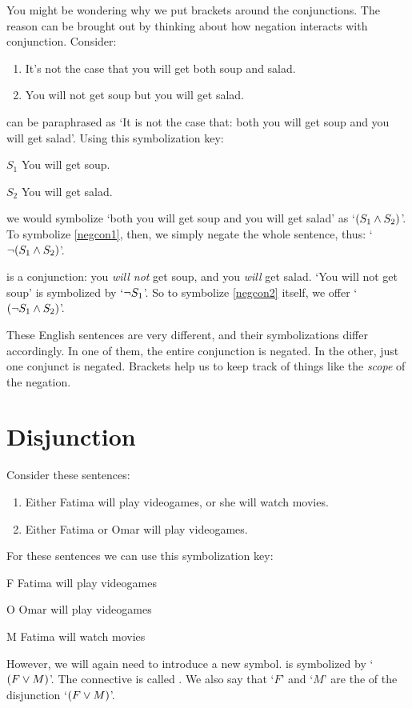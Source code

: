 You might be wondering why
we put brackets around the conjunctions. The reason can be brought out
by thinking about how negation interacts with conjunction. Consider:
	\begin{enumerate}
		\item\label{negcon1} It's not the case that you will get both soup and salad.
		\item\label{negcon2} You will not get soup but you will get salad.
	\end{enumerate}
 can be paraphrased as `It is not the case that: both you will get soup and you will get salad'. Using this symbolization key:
	\begin{ekey}
		\item[\ensuremath{S_1}] You will get soup.
		\item[\ensuremath{S_2}] You will get salad.
	\end{ekey}
we would symbolize `both you will get soup and you will get salad' as `$(S_1 \wedge S_2)$'. To symbolize \cref*{negcon1}, then, we simply negate the whole sentence, thus: `$\neg (S_1 \wedge S_2)$'.

 is a conjunction: you \emph{will not} get soup, and you \emph{will} get salad. `You will not get soup' is symbolized by `$\neg S_1$'. So to symbolize \cref*{negcon2} itself, we offer `$(\neg S_1 \wedge S_2)$'.

These English sentences are very different, and their symbolizations differ accordingly. In one of them, the entire conjunction is negated. In the other, just one conjunct is negated. Brackets help us to keep track of things like the \emph{scope} of the negation.

\section{Disjunction}

Consider these sentences:
	\begin{enumerate}
		\item\label{or1}Either Fatima will play videogames, or she will watch movies.
		\item\label{or2}Either Fatima or Omar will play videogames.
	\end{enumerate}
For these sentences we can use this symbolization key:
	\begin{ekey}
		\item[F] Fatima will play videogames
		\item[O] Omar will play videogames
		\item[M] Fatima will watch movies
	\end{ekey}
However, we will again need to introduce a new symbol.  is symbolized by `$(F \vee M)$'. The connective is called . We also say that `$F$' and `$M$' are the  of the disjunction `$(F \vee M)$'.

